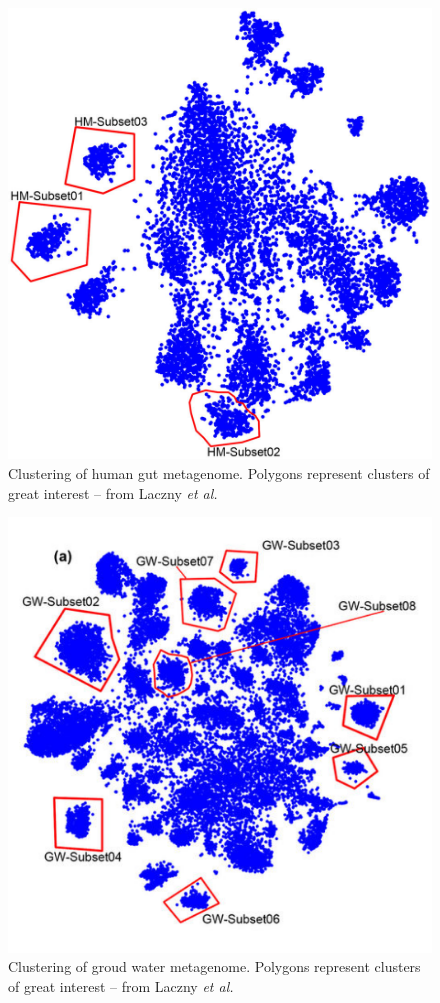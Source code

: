 \documentclass[twocolumn]{bmcart}%
\begin{document}
	\begin{figure}[p]
		\includegraphics[width=.9\linewidth]{bilder/humangutCluster.jpg}
		\caption{Clustering of human gut metagenome. Polygons represent clusters of great interest -- from Laczny \textit{et al.}\cite{Laczny2014}}
\label{img:humangut}	
\end{figure}%
	\begin{figure}[p]
		\includegraphics[width=.9\linewidth]{bilder/groudwaterCluster.png}
		\caption{Clustering of groud water metagenome. Polygons represent clusters of great interest -- from Laczny \textit{et al.}\cite{Laczny2014}}
		\label{img:groudwater}
	\end{figure}%
\end{document}
